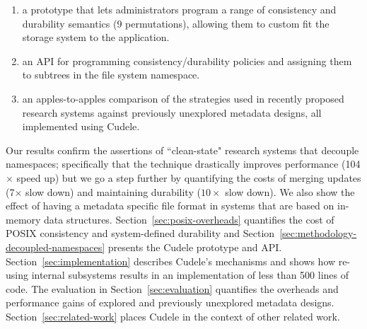\begin{enumerate}

  \item a prototype that lets administrators program a range of
  consistency and durability semantics (9 permutations), allowing them to custom
  fit the storage system to the application.

  \item an API for programming consistency/durability policies and assigning
  them to subtrees in the file system namespace.

  \item an apples-to-apples comparison of the strategies used in recently proposed research systems against
  previously unexplored metadata designs, all implemented using Cudele.

\end{enumerate}

Our results confirm the assertions of ``clean-state" research systems that
decouple namespaces; specifically that the technique drastically improves
performance (104\(\times\) speed up) but we go a step further by quantifying
the costs of merging updates (7\(\times\) slow down) and maintaining durability
(\(10\times\) slow down). We also show the effect of having a metadata specific
file format in systems that are based on in-memory data structures.
Section~\ref{sec:posix-overheads} quantifies the cost of POSIX
consistency and system-defined durability and
Section~\ref{sec:methodology-decoupled-namespaces} presents the Cudele
prototype and API. Section~\ref{sec:implementation} describes Cudele's
mechanisms and shows how re-using internal subsystems results in an
implementation of less than 500 lines of code. The evaluation in
Section~\ref{sec:evaluation} quantifies the overheads and performance gains of
explored and previously unexplored metadata designs.
Section~\ref{sec:related-work} places Cudele in the context of other related
work.

